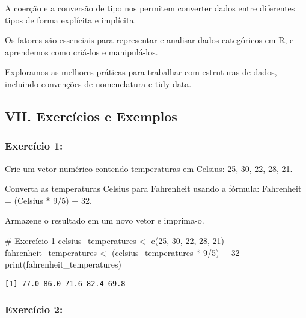 \documentclass[
  letterpaper,
  DIV=11,
  numbers=noendperiod]{scrartcl}
\newenvironment{Shaded}{\begin{snugshade}}{\end{snugshade}}
\newcommand{\CommentTok}[1]{\textcolor[rgb]{0.37,0.37,0.37}{#1}}
\newcommand{\DecValTok}[1]{\textcolor[rgb]{0.68,0.00,0.00}{#1}}
\newcommand{\FunctionTok}[1]{\textcolor[rgb]{0.28,0.35,0.67}{#1}}
\newcommand{\NormalTok}[1]{\textcolor[rgb]{0.00,0.23,0.31}{#1}}
\newcommand{\OtherTok}[1]{\textcolor[rgb]{0.00,0.23,0.31}{#1}}
\newcommand{\SpecialCharTok}[1]{\textcolor[rgb]{0.37,0.37,0.37}{#1}}
\begin{document}
A coerção e a conversão de tipo nos permitem converter dados entre
diferentes tipos de forma explícita e implícita.

Os fatores são essenciais para representar e analisar dados categóricos
em R, e aprendemos como criá-los e manipulá-los.

Exploramos as melhores práticas para trabalhar com estruturas de dados,
incluindo convenções de nomenclatura e tidy data.

\hypertarget{vii.-exercuxedcios-e-exemplos}{%
\subsection{VII. Exercícios e
Exemplos}\label{vii.-exercuxedcios-e-exemplos}}

\hypertarget{exercuxedcio-1}{%
\subsubsection{Exercício 1:}\label{exercuxedcio-1}}

Crie um vetor numérico contendo temperaturas em Celsius: 25, 30, 22, 28,
21.

Converta as temperaturas Celsius para Fahrenheit usando a fórmula:
Fahrenheit = (Celsius * 9/5) + 32.

Armazene o resultado em um novo vetor e imprima-o.

\begin{Shaded}
\begin{Highlighting}[]
\CommentTok{\# Exercício 1  }
\NormalTok{celsius\_temperatures }\OtherTok{\textless{}{-}} \FunctionTok{c}\NormalTok{(}\DecValTok{25}\NormalTok{, }\DecValTok{30}\NormalTok{, }\DecValTok{22}\NormalTok{, }\DecValTok{28}\NormalTok{, }\DecValTok{21}\NormalTok{)  }
\NormalTok{fahrenheit\_temperatures }\OtherTok{\textless{}{-}}\NormalTok{ (celsius\_temperatures }\SpecialCharTok{*} \DecValTok{9}\SpecialCharTok{/}\DecValTok{5}\NormalTok{) }\SpecialCharTok{+} \DecValTok{32}  
\FunctionTok{print}\NormalTok{(fahrenheit\_temperatures)}
\end{Highlighting}
\end{Shaded}

\begin{verbatim}
[1] 77.0 86.0 71.6 82.4 69.8
\end{verbatim}

\hypertarget{exercuxedcio-2}{%
\subsubsection{Exercício 2:}\label{exercuxedcio-2}}
\end{document}
